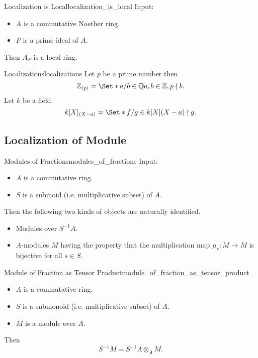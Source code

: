 \documentclass{article}
\begin{document}
\begin{theorem}{Localization is Local}{localization_is_local}
    Input:
    \begin{itemize}
        \item $A$ is a commutative Noether ring.
        \item $P$ is a prime ideal of $A$.
    \end{itemize}
    Then $A_P$ is a local ring.
\end{theorem}

\begin{example}{Localizations}{localizations}
    Let $p$ be a prime number then
    \[ \mathbb{Z}_{(p)} = \Set*{a/b\in\mathbb{Q}}{a,b\in\mathbb{Z},p\nmid b}. \]
    Let $k$ be a field.
    \[ k[X]_{(X-a)} = \Set*{f/g\in k[X]}{(X-a)\nmid g}. \]

\end{example}

\subsection{Localization of Module}

\begin{proposition}{Modules of Fractions}{modules_of_fractions}
    Input:
    \begin{itemize}
        \item $A$ is a commutative ring.
        \item $S$ is a submoid (i.e. multiplicative subset) of $A$.
    \end{itemize}
    Then the following two kinds of objects are naturally identified.
    \begin{itemize}
        \item Modules over $S^{-1}A$.
        \item $A$-modules $M$ having the property that the multiplication map $\mu_s:M\rightarrow M$ is bijective for all $s\in S$.
    \end{itemize}
\end{proposition}

\begin{theorem}{Module of Fraction as Tensor Product}{module_of_fraction_as_tensor_product}
    \begin{itemize}
        \item $A$ is a commutative ring.
        \item $S$ is a submonoid (i.e. multiplicative subset) of $A$.
        \item $M$ is a module over $A$.
    \end{itemize}
    Then
    \[ S^{-1}M = S^{-1}A \otimes_A M. \]
\end{theorem}
\end{document}
